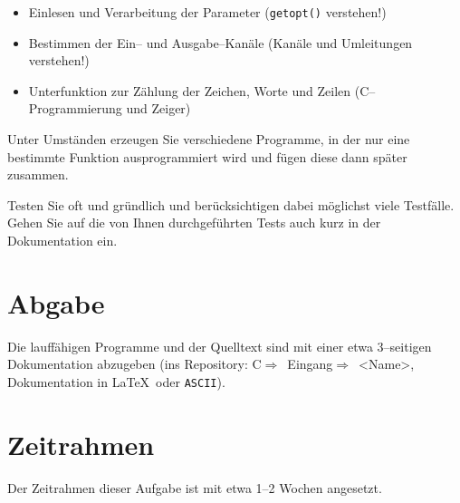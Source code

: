 \documentclass[a4paper,notitlepage,parskip=half,plainheadsepline]{scrartcl}
\newif\ifloesung
\begin{document}
\begin{itemize}
\item Einlesen und Verarbeitung der Parameter (\texttt{getopt()} verstehen!)
\item Bestimmen der Ein-- und Ausgabe--Kanäle (Kanäle und Umleitungen verstehen!)
\item Unterfunktion zur Zählung der Zeichen, Worte und Zeilen (C--Programmierung und Zeiger)
\end{itemize}

Unter Umständen erzeugen Sie verschiedene Programme, in der nur eine bestimmte Funktion ausprogrammiert wird und fügen diese dann später zusammen.

Testen Sie oft und gründlich und berücksichtigen dabei möglichst viele Testfälle. Gehen Sie auf die von Ihnen durchgeführten Tests auch kurz in der Dokumentation ein.

\section{Abgabe}
Die lauffähigen Programme und der Quelltext sind mit einer etwa 3--seitigen Dokumentation abzugeben (ins Repository: C$\Rightarrow$\ Eingang$\Rightarrow$\ <Name>, Dokumentation in \LaTeX\  oder \texttt{ASCII}).

\section{Zeitrahmen}
Der Zeitrahmen dieser Aufgabe ist mit etwa 1--2 Wochen angesetzt.

\ifloesung
\newpage
\end{document}
